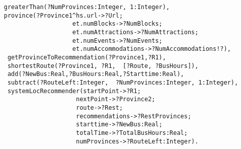 \begin{verbatim}
     greaterThan(?NumProvinces:Integer, 1:Integer),
     province(?Province1^hs.url->?Url;
                        et.numBlocks->?NumBlocks;
                        et.numAttractions->?NumAttractions;
                        et.numEvents->?NumEvents;
                        et.numAccommodations->?NumAccommodations!?),
      getProvinceToRecommendation(?Province1,?R1),
      shortestRoute(?Province1, ?R1,  [?Route, ?BusHours]),
      add(?NewBus:Real,?BusHours:Real,?Starttime:Real),
      subtract(?RouteLeft:Integer,  ?NumProvinces:Integer, 1:Integer),
      systemLocRecommender(startPoint->?R1; 
                         nextPoint->?Province2; 
                         route->?Rest;
                         recommendations->?RestProvinces;
                         starttime->?NewBus:Real;
                         totalTime->?TotalBusHours:Real;
                         numProvinces->?RouteLeft:Integer).                         
\end{verbatim}
                         
